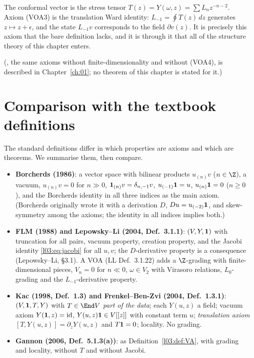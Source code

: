 \begin{physics}
The conformal vector is the stress tensor $T(z) = Y(\omega,z) = \sum L_nz^{-n-2}$. Axiom (VOA3) is
the translation Ward identity: $L_{-1} = \oint T(z)\,dz$ generates $z\mapsto z+\epsilon$, and the
state $L_{-1}v$ corresponds to the field $\partial v(z)$. It is precisely this axiom that the bare
definition lacks, and it is through it that all of the structure theory of this chapter enters.
\end{physics}

(, the same axioms without finite-dimensionality and without (VOA4), is described in
Chapter~\ref{ch:01}; no theorem of this chapter is stated for it.)

\section{Comparison with the textbook definitions}\label{l03:sec:compare}

The standard definitions differ in which properties are axioms and which are theorems. We
summarise them, then compare.

\begin{itemize}
\item \textbf{Borcherds (1986)}: a vector space with bilinear products $u_{(n)}v$ ($n\in\Z$), a
  vacuum, $u_{(n)}v = 0$ for $n\gg0$, $\mathbf{1}_{(n)}v = \delta_{n,-1}v$, $u_{(-1)}\mathbf{1} = u$,
  $u_{(n)}\mathbf{1} = 0$ ($n\ge0$), and the Borcherds identity in all three indices as the main
  axiom. (Borcherds originally wrote it with a derivation $D$, $Du = u_{(-2)}\mathbf{1}$, and
  skew-symmetry among the axioms; the identity in all indices implies both.)
\item \textbf{FLM (1988) and Lepowsky--Li (2004, Def.~3.1.1)}: $(V,Y,\mathbf{1})$ with
  truncation for all pairs, vacuum property, creation property, and the Jacobi identity
  \eqref{l03:eq:jacobi} for all $u,v$; the $D$-derivative property is a consequence
  (Lepowsky--Li, §3.1). A VOA (LL Def.~3.1.22) adds a $\Z$-grading with finite-dimensional pieces,
  $V_n = 0$ for $n\ll0$, $\omega\in V_2$ with Virasoro relations, $L_0$-grading and the
  $L_{-1}$-derivative property.
\item \textbf{Kac (1998, Def.~1.3) and Frenkel--Ben-Zvi (2004, Def.~1.3.1)}: $(V,\mathbf{1},T,Y)$
  with $T\in\End V$ \emph{part of the data}; each $Y(u,z)$ a field; vacuum axiom
  $Y(\mathbf{1},z) = \mathrm{id}$, $Y(u,z)\mathbf{1}\in V[[z]]$ with constant term $u$;
  \emph{translation axiom} $[T,Y(u,z)] = \partial_zY(u,z)$ and $T\mathbf{1} = 0$; locality. No
  grading.
\item \textbf{Gannon (2006, Def.~5.1.3(a))}: as Definition~\ref{l03:def:VA}, with grading and
  locality, without $T$ and without Jacobi.
\end{itemize}

